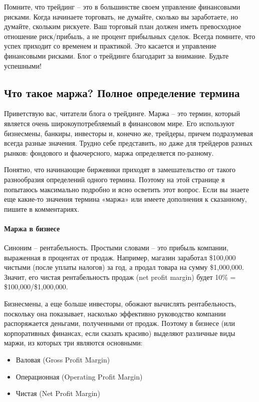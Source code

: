 \documentclass[a5paper]{article}
\begin{document}
Помните, что трейдинг – это в большинстве своем управление финансовыми рисками. Когда начинаете торговать, не думайте, сколько вы заработаете, но думайте, скольким рискуете. Ваш торговый план должен иметь превосходное отношение риск/прибыль, а не процент прибыльных сделок. Всегда помните, что успех приходит со временем и практикой. Это касается и управление финансовыми рисками. Блог о трейдинге благодарит за внимание. Будьте успешными!

\subsection{Что такое маржа? Полное определение термина}

Приветствую вас, читатели блога о трейдинге. Маржа – это термин, который является очень широкоупотребляемый в финансовом мире. Его используют бизнесмены, банкиры, инвесторы и, конечно же, трейдеры, причем подразумевая всегда разные значения. Трудно себе представить, но даже для трейдеров разных рынков: фондового и фьючерсного, маржа определяется по-разному.

Понятно, что начинающие биржевики приходят в замешательство от такого разнообразия определений одного термина. Поэтому на этой странице я попытаюсь максимально подробно и ясно осветить этот вопрос. Если вы знаете еще какие-то значения термина «маржа»  или имеете дополнения к сказанному, пишите в комментариях.

\paragraph{Маржа в бизнесе}

Синоним – рентабельность. Простыми словами – это прибыль компании, выраженная в процентах от продаж. Например, магазин заработал \$100,000 чистыми (после уплаты налогов) за год, а продал товара на сумму \$1,000,000. Значит, его чистая рентабельность продаж (net profit margin) будет 10\% = \$100,000/\$1,000,000.

Бизнесмены, а еще больше инвесторы, обожают вычислять рентабельность, поскольку она показывает, насколько эффективно руководство компании распоряжается деньгами, полученными от продаж. Поэтому в бизнесе (или корпоративных финансах, если сказать красиво) выделяют различные виды маржи, из которых три являются основными:
\begin{itemize}
\item     Валовая (Gross Profit Margin)
\item     Операционная (Operating Profit Margin)
\item     Чистая (Net Profit Margin)
\end{itemize}
\end{document}
